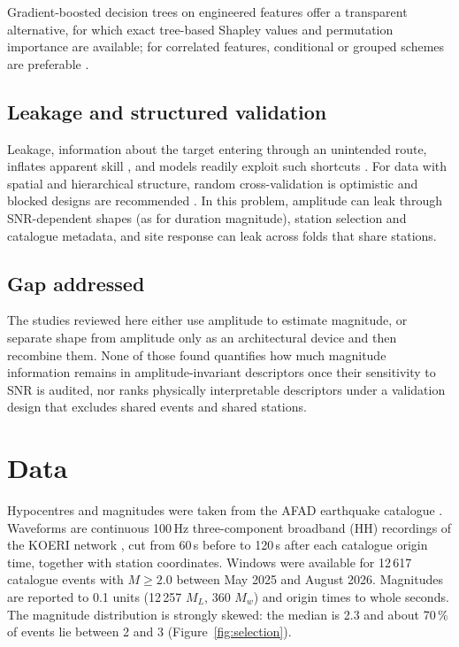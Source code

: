 \documentclass[11pt,a4paper]{article}
\begin{document}
Gradient-boosted decision trees \citep{ke2017} on engineered features
offer a transparent alternative, for which exact tree-based Shapley values
\citep{lundberg2020} and permutation importance \citep{breiman2001} are
available; for correlated features, conditional or grouped schemes are
preferable \citep{strobl2008}.

\subsection{Leakage and structured validation}
Leakage, information about the target entering through an unintended
route, inflates apparent skill \citep{kaufman2011}, and models readily
exploit such shortcuts \citep{geirhos2020}. For data with spatial and
hierarchical structure, random cross-validation is optimistic and blocked
designs are recommended \citep{roberts2017}. In this problem, amplitude can
leak through SNR-dependent shapes (as for duration magnitude), station
selection and catalogue metadata, and site response can leak across folds
that share stations.

\subsection{Gap addressed}
The studies reviewed here either use amplitude to estimate magnitude, or
separate shape from amplitude only as an architectural device and then
recombine them. None of those found quantifies how much magnitude
information remains in amplitude-invariant descriptors once their
sensitivity to SNR is audited, nor ranks physically interpretable
descriptors under a validation design that excludes shared events and
shared stations.

\section{Data}
\label{sec:data}

Hypocentres and magnitudes were taken from the AFAD earthquake catalogue
. Waveforms are continuous 100\,Hz three-component
broadband (HH) recordings of the KOERI network , cut from 60\,s
before to 120\,s after each catalogue origin time, together with station
coordinates. Windows were available for 12\,617 catalogue events with
$M \geq 2.0$ between May 2025 and August 2026. Magnitudes are reported to
0.1 units (12\,257 $M_L$, 360 $M_w$) and origin times to whole seconds.
The magnitude distribution is strongly skewed: the median is 2.3 and about
70\,\% of events lie between 2 and 3 (Figure~\ref{fig:selection}).
\end{document}
